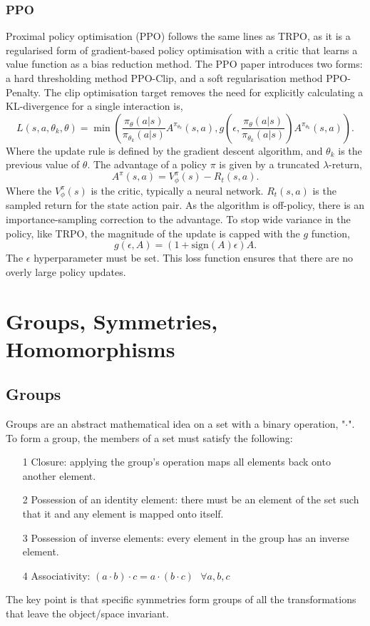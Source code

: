 \subsubsection{PPO}
Proximal policy optimisation (PPO) follows the same lines as TRPO, as it is a regularised form of gradient-based policy optimisation with a critic that learns a value function as a bias reduction method. The PPO paper introduces two forms: a hard thresholding method PPO-Clip, and a soft regularisation method PPO-Penalty. The clip optimisation target removes the need for explicitly calculating a KL-divergence for a single interaction is,
\begin{equation}
	L(s, a, \theta_k, \theta) = \min \left( \frac{\pi_\theta(a|s)}{\pi_{\theta_k}(a|s)} A^{\pi_{\theta_k}}(s,a), g\left(\epsilon, \frac{\pi_\theta(a|s)}{\pi_{\theta_k}(a|s)} \right)A^{\pi_{\theta_k}}(s, a) \right).
\end{equation}
Where the update rule is defined by the gradient descent algorithm, and $\theta_k$ is the previous value of $\theta$. The advantage of a policy $\pi$ is given by a truncated $\lambda$-return,
\begin{equation}
	A^{\pi}(s, a) = V^\pi _\phi(s) - R_t(s, a).
\end{equation}
Where the $V^\pi _ \phi(s)$ is the critic, typically a neural network. $R_t(s, a)$ is the sampled return for the state action pair. As the algorithm is off-policy, there is an importance-sampling correction to the advantage. To stop wide variance in the policy, like TRPO, the magnitude of the update is capped with the $g$ function,
\begin{equation}
	g(\epsilon, A) = (1 + \text{sign}(A)\epsilon)A.
\end{equation}
The $\epsilon$ hyperparameter must be set. This loss function ensures that there are no overly large policy updates.


\section{Groups, Symmetries, Homomorphisms}

\subsection{Groups}
Groups are an abstract mathematical idea on a set with a binary operation, "$\cdot$". To form a group, the members of a set must satisfy the following:
\begin{itemize}
	\item[1] Closure: applying the group's operation maps all elements back onto another element.
	\item[2] Possession of an identity element: there must be an element of the set such that it and any element is mapped onto itself.
	\item[3] Possession of inverse elements: every element in the group has an inverse element.
	\item [4] Associativity: $(a \cdot b) \cdot c = a \cdot (b \cdot c) \text{  }\forall a, b, c$
\end{itemize}
The key point is that specific symmetries form groups of all the transformations that leave the object/space invariant.

